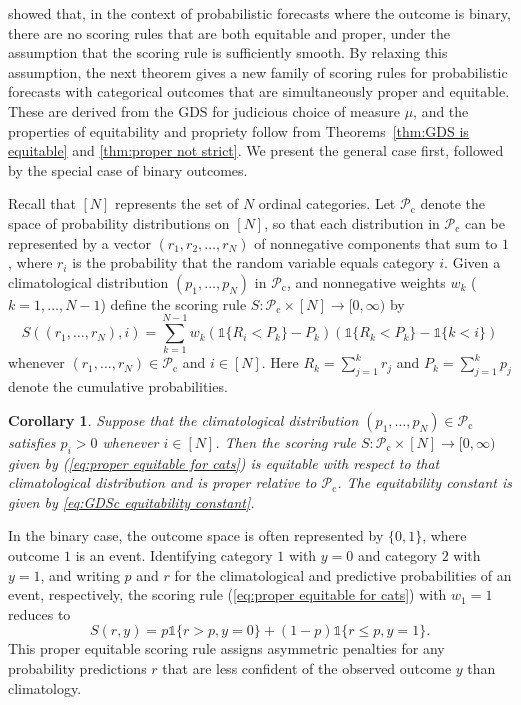 \documentclass[10pt]{article} %
\theoremstyle{theorem}
\newtheorem{cor}{Corollary}
\theoremstyle{definition}
\newcommand{\one}{\mathds{1}}
\newcommand{\GDS}{\mathrm{GDS}}
\begin{document}
\citet{jolliffe2008proper} showed that, in the context of probabilistic forecasts where the outcome is binary, there are no scoring rules that are both equitable and proper, under the assumption that the scoring rule is sufficiently smooth. By relaxing this assumption, the next theorem gives a new family of scoring rules for probabilistic forecasts with categorical outcomes that are simultaneously proper and equitable. These are derived from the $\GDS$ for judicious choice of measure $\mu$, and the properties of equitability and propriety follow from Theorems~\ref{thm:GDS is equitable} and \ref{thm:proper not strict}. We present the general case first, followed by the special case of binary outcomes.

Recall that $[N]$ represents the set of $N$ ordinal categories. Let $\mathcal{P}_\mathrm{c}$ denote the space of probability distributions on $[N]$, so that each distribution in $\mathcal{P}_\mathrm{c}$ can be represented by a vector $(r_1,r_2,\ldots,r_N)$ of nonnegative components that sum to $1$, where $r_i$ is the probability that the random variable equals category $i$. Given a  climatological distribution $(p_1,\ldots, p_N)$ in  $\mathcal{P}_\mathrm{c}$, and nonnegative weights $w_k$ ($k=1,\ldots,N-1$) define the scoring rule $S:\mathcal{P}_\mathrm{c}\times[N]\to[0,\infty)$ by
\begin{equation}\label{eq:proper equitable for cats}
S((r_1,\ldots,r_N), i) = \sum_{k=1}^{N-1} w_k(\one\{R_i<P_k\}-P_k)(\one\{R_k<P_k\} - \one\{k<i\})
\end{equation}
whenever $(r_1,\ldots,r_N)\in\mathcal{P}_\mathrm{c}$ and $i\in[N]$. Here $R_k=\sum_{j=1}^k r_j$ and $P_k=\sum_{j=1}^k p_j$ denote the cumulative probabilities. 

\begin{cor}\label{cor:proper equitable for cats}
Suppose that the climatological distribution $(p_1,\ldots, p_N)\in \mathcal{P}_\mathrm{c}$ satisfies $p_i>0$ whenever $i\in[N]$. Then the scoring rule $S:\mathcal{P}_\mathrm{c}\times[N]\to[0,\infty)$ given by (\ref{eq:proper equitable for cats}) is equitable with respect to that climatological distribution and is proper relative to $\mathcal{P}_\mathrm{c}$. The equitability constant is given by \eqref{eq:GDSc equitability constant}.
\end{cor}

In the binary case, the outcome space is often represented by $\{0,1\}$, where outcome $1$ is an event. Identifying category $1$ with $y=0$ and category $2$ with $y=1$, and writing $p$ and $r$ for the climatological and predictive probabilities of an event, respectively, the scoring rule (\ref{eq:proper equitable for cats}) with $w_1=1$ reduces to
\begin{equation}\label{eq:proper equitable for binary}
S(r,y)=p\one\{r>p, y=0\} + (1-p)\one\{r\leq p, y=1\}.
\end{equation}
This proper equitable scoring rule assigns asymmetric penalties for any probability predictions $r$ that are less confident of the observed outcome $y$ than climatology.
\end{document}
